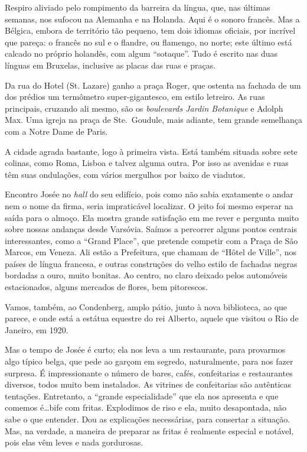 Respiro aliviado pelo rompimento da barreira da língua, que, nas últimas semanas, nos sufocou na Alemanha e na Holanda. Aqui é o sonoro francês. Mas a Bélgica, embora de território tão pequeno, tem dois idiomas oficiais, por incrível que pareça: o francês no sul e o flandre, ou flamengo, no norte; este último está calcado no próprio holandês, com algum ``sotaque''. Tudo é escrito nas duas línguas em Bruxelas, inclusive as placas das ruas e praças.

Da rua do Hotel (St. Lazare) ganho a praça Roger, que ostenta na fachada de um dos prédios um termômetro super-gigantesco, em estilo letreiro. As ruas principais, cruzando ali mesmo, são os \textit{boulevards Jardin Botanique} e Adolph Max. Uma igreja na praça de Ste.~Goudule, mais adiante, tem grande semelhança com a Notre Dame de Paris.

A cidade agrada bastante, logo à primeira vista. Está também situada sobre sete colinas, como Roma, Lisboa e talvez alguma outra. Por isso as avenidas e ruas têm suas ondulações, com vários mergulhos por baixo de viadutos.

Encontro Josée no \textit{hall} do seu edifício, pois como não sabia exatamente o andar nem o nome da firma, seria impraticável localizar. O jeito foi mesmo esperar na saída para o almoço. Ela mostra grande satisfação em me rever e pergunta muito sobre nossas andanças desde Varsóvia. Saímos a percorrer alguns pontos centrais interessantes, como a ``Grand Place'', que pretende competir com a Praça de São Marcos, em Veneza. Ali estão a Prefeitura, que chamam de ``Hôtel de Ville'', nos países de língua francesa, e outras construções do velho estilo de fachadas negras bordadas a ouro, muito bonitas. Ao centro, no claro deixado pelos automóveis estacionados, alguns mercados de flores, bem pitorescos.

Vamos, também, ao Condenberg, amplo pátio, junto à nova biblioteca, ao que parece, e onde está a estátua equestre do rei Alberto, aquele que visitou o Rio de Janeiro, em 1920.

Mas o tempo de Josée é curto; ela nos leva a um restaurante, para provarmos algo típico belga, que pede ao garçom em segredo, naturalmente, para nos fazer surpresa. É impressionante o número de bares, cafés, confeitarias e restaurantes diversos, todos muito bem instalados. As vitrines de confeitarias são autênticas tentações. Entretanto, a ``grande especialidade'' que ela nos apresenta e que comemos é\ldots bife com fritas. Explodimos de riso e ela, muito desapontada, não sabe o que entender. Dou as explicações necessárias, para consertar a situação. Mas, na verdade, a maneira de preparar as fritas é realmente especial e notável, pois elas vêm leves e nada gordurosas.

